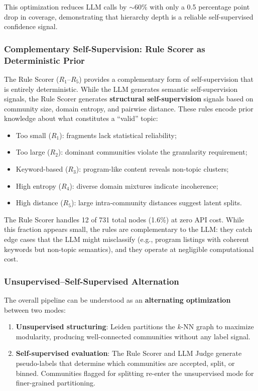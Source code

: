 \documentclass[10pt,twocolumn,twoside]{article}
\begin{document}
This optimization reduces LLM calls by $\sim$60\% with only a 0.5 percentage point 
drop in coverage, demonstrating that hierarchy depth is a reliable self-supervised 
confidence signal.

\subsubsection{Complementary Self-Supervision: Rule Scorer as Deterministic Prior}

The Rule Scorer ($R_1$--$R_5$) provides a complementary form of self-supervision that 
is entirely deterministic. While the LLM generates semantic self-supervision signals, 
the Rule Scorer generates \textbf{structural self-supervision} signals based on 
community size, domain entropy, and pairwise distance. These rules encode prior 
knowledge about what constitutes a ``valid'' topic:

\begin{itemize}[nosep]
    \item Too small ($R_1$): fragments lack statistical reliability;
    \item Too large ($R_2$): dominant communities violate the granularity requirement;
    \item Keyword-based ($R_3$): program-like content reveals non-topic clusters;
    \item High entropy ($R_4$): diverse domain mixtures indicate incoherence;
    \item High distance ($R_5$): large intra-community distances suggest latent splits.
\end{itemize}

The Rule Scorer handles 12 of 731 total nodes (1.6\%) at zero API cost. While this 
fraction appears small, the rules are complementary to the LLM: they catch edge cases 
that the LLM might misclassify (e.g., program listings with coherent keywords but 
non-topic semantics), and they operate at negligible computational cost.

\subsubsection{Unsupervised--Self-Supervised Alternation}

The overall pipeline can be understood as an \textbf{alternating optimization} between 
two modes:

\begin{enumerate}[nosep]
    \item \textbf{Unsupervised structuring}: Leiden partitions the $k$-NN graph to 
    maximize modularity, producing well-connected communities without any label signal.
    \item \textbf{Self-supervised evaluation}: The Rule Scorer and LLM Judge generate 
    pseudo-labels that determine which communities are accepted, split, or binned. 
    Communities flagged for splitting re-enter the unsupervised mode for finer-grained 
    partitioning.
\end{enumerate}
\end{document}

